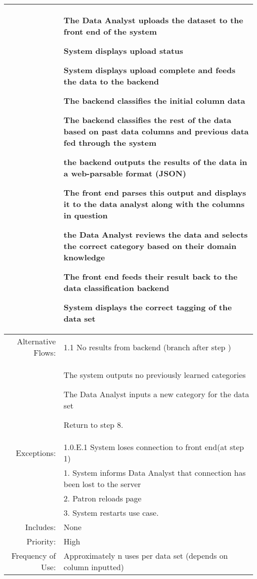 \documentclass[12pt,oneside,letterpaper]{article}
\newenvironment{packed_enumerate}{ %
\vspace{-7mm}
\begin{enumerate}
  \setlength{\itemsep}{0pt}
  \setlength{\parskip}{0pt}
  \setlength{\parsep}{0pt}
}{\end{enumerate}
\vspace{-8mm}}
\begin{document}
\begin{longtable}{|r|p{3.8in}|}
&  %
\begin{packed_enumerate}
\item The Data Analyst uploads the dataset to the front end of the system
\item System displays upload status
\item System displays upload complete and feeds the data to the backend
\item The backend classifies the initial column data
\item The backend classifies the rest of the data based on past data columns and previous data fed through the system
\item the backend outputs the results of the data in a web-parsable format (JSON)
\item The front end parses this output and displays it to the data analyst along with the columns in question
\item the Data Analyst reviews the data and selects the correct category based on their domain knowledge
\item The front end feeds their result back to the data classification backend
\item System displays the correct tagging of the data set
\end{packed_enumerate}\\
\hline
Alternative Flows:&1.1 No results from backend (branch after step )\\
&  %
\begin{packed_enumerate}
\item The system outputs no previously learned categories
\item The Data Analyst inputs a new category for the data set
\item Return to step 8.
\end{packed_enumerate}\\
\hline
Exceptions:&1.0.E.1 System loses connection to front end(at step 1)\\
&1. 	System informs Data Analyst that connection has been lost to the server\\
&2.	Patron reloads page\\
&3.	System restarts use case.\\
\hline
Includes:&None\\
\hline
Priority:&High\\
\hline
Frequency of Use:&Approximately n uses per data set (depends on column inputted)\\

\end{longtable}
\end{document}
